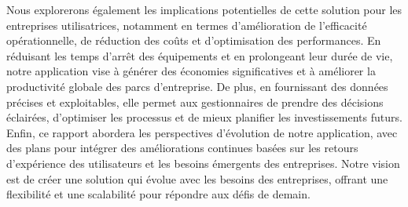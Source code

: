 Nous explorerons également les implications potentielles de cette solution pour les entreprises utilisatrices, notamment en termes d’amélioration de l’efficacité opérationnelle, de réduction des coûts et d’optimisation des performances. En réduisant les temps d’arrêt des équipements et en prolongeant leur durée de vie, notre application vise à générer des économies significatives et à améliorer la productivité globale des parcs d’entreprise. De plus, en fournissant des données précises et exploitables, elle permet aux gestionnaires de prendre des décisions éclairées, d’optimiser les processus et de mieux planifier les investissements futurs.\\

Enfin, ce rapport abordera les perspectives d’évolution de notre application, avec des plans pour intégrer des améliorations continues basées sur les retours d'expérience des utilisateurs et les besoins émergents des entreprises. Notre vision est de créer une solution qui évolue avec les besoins des entreprises, offrant une flexibilité et une scalabilité pour répondre aux défis de demain.